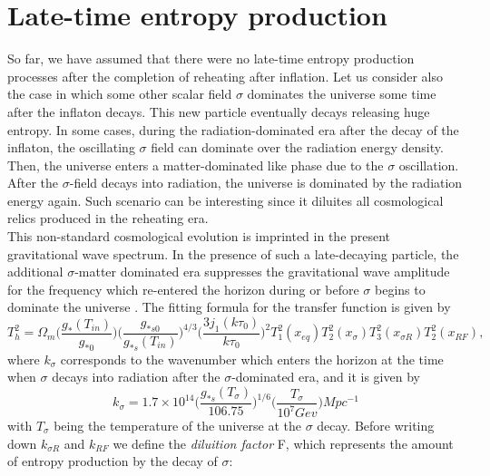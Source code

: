 \documentclass[11pt,a4paper,twoside]{book}
\begin{document}
\section{Late-time entropy production}
So far, we have assumed that there were no late-time entropy production processes after the completion of reheating after inflation. Let us consider also the case in which some other scalar field $\sigma$  dominates the universe some time after the inflaton decays. This new particle eventually decays releasing huge entropy. In some cases, during the radiation-dominated era after the decay of the inflaton, the oscillating $\sigma$ field can dominate over the radiation energy density. Then, the universe enters a matter-dominated like phase due to the $\sigma$ oscillation. After the $\sigma$-field decays into radiation, the universe is dominated by the radiation energy again. Such scenario can be interesting since it diluites all cosmological relics produced in the reheating era. \\
This non-standard cosmological evolution is imprinted in the present gravitational wave spectrum. In the presence of such a late-decaying particle, the additional $\sigma$-matter dominated era suppresses the gravitational wave amplitude for the frequency which re-entered the horizon during or before $\sigma$ begins to dominate the universe \cite{Chap3:ProibingReheatingTemperature2008}. The fitting formula for the transfer function is given by \cite{Chap3:ProibingReheatingTemperature2008}
\begin{equation}
	\label{Chap3:TransferFunctionLateEntropy}
	T^{2}_{h} = \Omega_{m}\Bigg(\frac{g_{*}(T_{in})}{g_{*0}}\Bigg)\Bigg(\frac{g_{*s0}}{g_{*s}(T_{in})}\Bigg)^{4/3}\Bigg (\frac{3j_{1}(k\tau_{0})}{k\tau_{0}}\Bigg)^{2}T_{1}^{2}(x_{eq})T_{2}^{2}(x_{\sigma})T_{3}^{2}(x_{\sigma R})T^{2}_{2}(x_{RF}),
\end{equation}
where $ k_{\sigma} $ corresponds to the wavenumber which enters the horizon at the time  when $\sigma$ decays into radiation after the $\sigma$-dominated era, and it is given by
\begin{equation}
\label{Chap3:kSigma}
k_{\sigma} = 1.7 \times 10^{14} \Big (\frac{g_{*s}(T_{\sigma})}{106.75}\Bigg)^{1/6}\Bigg (\frac{T_{\sigma}}{10^{7} Gev}\Bigg) Mpc^{-1}
\end{equation}
with $ T_{\sigma} $ being the temperature of the universe at the $\sigma$ decay. Before writing down $ k_{\sigma R} $ and $ k_{RF} $ we define the \textit{diluition factor} F, which represents the amount of entropy production by the decay of $\sigma$:
\end{document}
